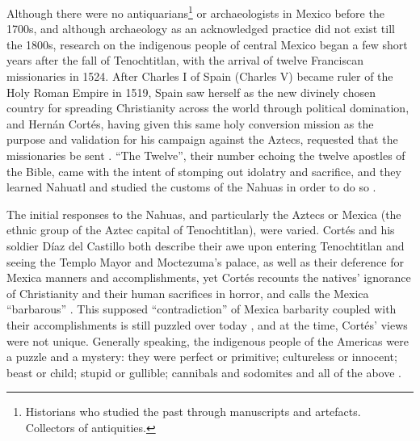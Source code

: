 Although there were no antiquarians\footnote{Historians who studied the past through manuscripts and artefacts. Collectors of antiquities.} or archaeologists in Mexico before the 1700s, and although archaeology as an acknowledged practice did not exist till the 1800s, research on the indigenous people of central Mexico began a few short years after the fall of Tenochtitlan, with the arrival of twelve Franciscan missionaries in 1524. 
After Charles I of Spain (Charles V) became ruler of the Holy Roman Empire in 1519, Spain saw herself as the new divinely chosen country for spreading Christianity across the world through political domination, and Hernán Cortés, having given this same holy conversion mission as the purpose and validation for his campaign against the Aztecs, requested that the missionaries be sent \parencites[40]{Cortes1971}[168-169]{Diaz2005}. 
“The Twelve”, their number echoing the twelve apostles of the Bible, came with the intent of stomping out idolatry and sacrifice, and they learned Nahuatl and studied the customs of the Nahuas in order to do so \parencites[4]{Diaz2005}{Swarthout2004}. 

The initial responses to the Nahuas, and particularly the Aztecs or Mexica (the ethnic group of the Aztec capital of Tenochtitlan), were varied. Cortés and his soldier Díaz del Castillo both describe their awe upon entering Tenochtitlan and seeing the Templo Mayor and Moctezuma’s palace, as well as their deference for Mexica manners and accomplishments, yet Cortés recounts the natives’ ignorance of Christianity and their human sacrifices in horror, and calls the Mexica “barbarous” \parencites[35,105-109]{Cortes1971}[216]{Diaz1963}. 
This supposed “contradiction” of Mexica barbarity coupled with their accomplishments is still puzzled over today \parencite[this idea largely lingers in discussions of Aztec sacrifice, ex.][51]{Carrasco1999}, and at the time, Cortés’ views were not unique. 
Generally speaking, the indigenous people of the Americas were a puzzle and a mystery: they were perfect or primitive; cultureless or innocent; beast or child; stupid or gullible; cannibals and sodomites and all of the above \parencite[105]{Restall2003}.

